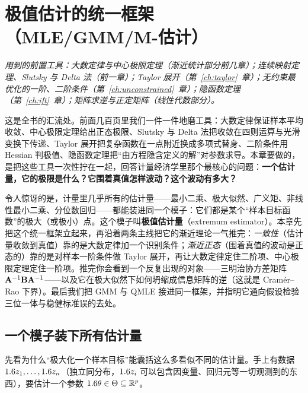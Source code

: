 \chapter{极值估计的统一框架（MLE/GMM/M-估计）}
\label{ch:extremum}

\noindent\emph{用到的前置工具：大数定律与中心极限定理（渐近统计部分前几章）；连续映射定理、Slutsky 与 Delta 法（前一章）；Taylor 展开（第~\ref{ch:taylor}~章）；无约束最优化的一阶、二阶条件（第~\ref{ch:unconstrained}~章）；隐函数定理（第~\ref{ch:ift}~章）；矩阵求逆与正定矩阵（线性代数部分）。}
\medskip

这是全书的汇流处。前面几百页里我们一件一件地磨工具：大数定律保证样本平均收敛、中心极限定理给出正态极限、Slutsky 与 Delta 法把收敛在四则运算与光滑变换下传递、Taylor 展开把复杂函数在一点附近换成多项式替身、二阶条件用 Hessian 判极值、隐函数定理把``由方程隐含定义的解''对参数求导。本章要做的，是把这些工具一次性拧在一起，回答计量经济学里那个最核心的问题：\textbf{一个估计量，它的极限是什么？它围着真值怎样波动？这个波动有多大？}

令人惊讶的是，计量里几乎所有的估计量——最小二乘、极大似然、广义矩、非线性最小二乘、分位数回归——都能装进同一个模子：它们都是某个``样本目标函数''的极大（或极小）点。这个模子叫\textbf{极值估计量}（extremum estimator）。本章先把这个统一框架立起来，再沿着两条主线把它的渐近理论一气推完：\emph{一致性}（估计量收敛到真值）靠的是大数定律加一个识别条件；\emph{渐近正态}（围着真值的波动是正态的）靠的是对样本一阶条件做 Taylor 展开，再让大数定律定住二阶项、中心极限定理定住一阶项。推完你会看到一个反复出现的对象——三明治协方差矩阵 ${\mathbf{A}}^{-1}\mathbf{B}{\mathbf{A}}^{-1}$——以及它在极大似然下如何坍缩成信息矩阵的逆（这就是 Cramér--Rao 下界）。最后我们把 GMM 与 QMLE 接进同一框架，并指明它通向假设检验三位一体与稳健标准误的去处。

\section{一个模子装下所有估计量}
\label{sec:extremum-1}

先看为什么``极大化一个样本目标''能囊括这么多看似不同的估计量。手上有数据 $1.6 z_1,\dots,1.6 z_n$（独立同分布，$1.6 z_i$ 可以包含因变量、回归元等一切观测到的东西），要估计一个参数 $1.6\theta\in\Theta\subseteq\mathbb{R}^p$。


